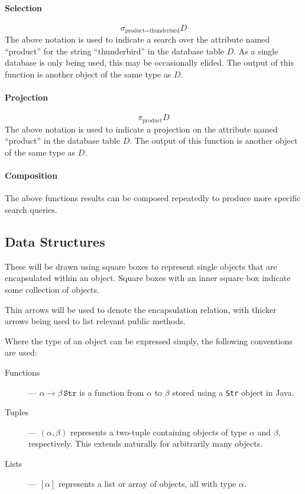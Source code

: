 \paragraph{Selection} \[\sigma_{\text{product}=\text{thunderbird}}D\]
The above notation is used to indicate a search over the attribute named
``product'' for the string ``thunderbird'' in the database table $D$.  As a
single database is only being used, this may be occasionally elided.  The output
of this function is another object of the same type as $D$.

\paragraph{Projection}
\[\pi_{\text{product}}D\]
The above notation is used to indicate a projection on the attribute named
``product'' in the database table $D$.  The output of this function is another
object of the same type as $D$.

\paragraph{Composition}
The above functions results can be composed repeatedly to produce more specific
search queries.

\subsection{Data Structures}
These will be drawn using square boxes to represent single objects that are encapsulated
within an object.  Square boxes with an inner square box indicate some collection
of objects.

Thin arrows will be used to denote the encapsulation relation, with thicker
arrows being used to list relevant public methods.

Where the type of an object can be expressed simply, the following conventions are used:
\begin{description}
	\item [Functions] --- $\alpha \rightarrow \beta \, \texttt{Str}$ is a function from $\alpha$ to $\beta$ stored using a \texttt{Str} object in Java.
	\item [Tuples] --- $(\alpha, \beta)$ represents a two-tuple containing objects of type $\alpha$ and $\beta$, respectively.  This extends naturally for arbitrarily many objects.
	\item [Lists] --- $[\alpha]$ represents a list or array of objects, all with type $\alpha$.
\end{description}

